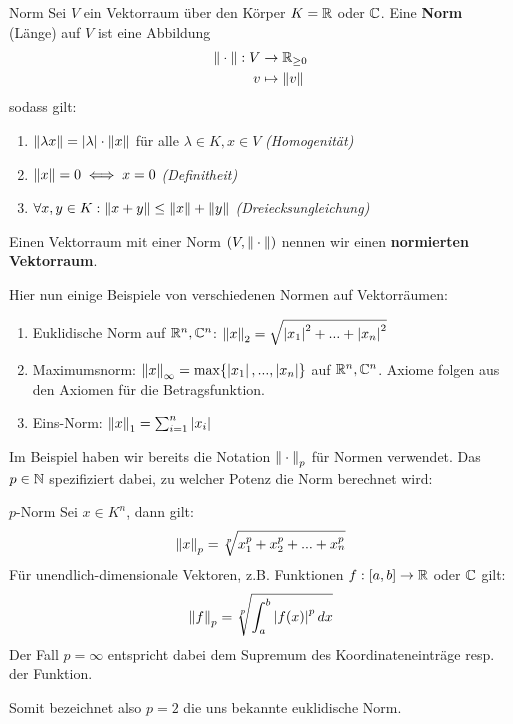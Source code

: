 \begin{definition}{Norm}{}
Sei $V$ ein Vektorraum über den Körper $K = \mathbb{R}$ oder $\mathbb{C}$. Eine \textbf{Norm} (Länge) auf $V$ ist eine Abbildung
\begin{align*}
    \left\|\:\cdot\:\right\|: V &\to \mathbb{R}_{\geq 0}\\
    v &\mapsto \left\|v\right\|
\end{align*}
sodass gilt:
\begin{enumerate}[label=N\arabic*)]
    \item $\left\|\lambda x\right\| = \left|\lambda\right| \cdot \left\|x\right\|$ für alle $\lambda \in K, x \in V$ \hfill \textit{(Homogenität)}
    \item $\left\|x\right\| = 0 \iff x = 0$ \hfill \textit{(Definitheit)}
    \item $\forall x,y \in K: \left\|x+y\right\| \leq \left\|x\right\| + \left\|y\right\|$ \hfill \textit{(Dreiecksungleichung)}
\end{enumerate}
Einen Vektorraum mit einer Norm $(V, \left\|\:\cdot\:\right\|)$ nennen wir einen \textbf{normierten Vektorraum}.
\end{definition}

\begin{example} \label{ex_norm_vr}Hier nun einige Beispiele von verschiedenen Normen auf Vektorräumen:
\begin{enumerate}[label=(\alph*)]
    \item Euklidische Norm auf $\mathbb{R}^n, \mathbb{C}^n$: $\left\|x\right\|_2 = \sqrt{\left|x_1\right|^2+...+\left|x_n\right|^2}$
    \item Maximumsnorm: $\left\|x\right\|_\infty = \max\{\left|x_1\right|,...,\left|x_n\right|\}$
    auf $\mathbb{R}^n, \mathbb{C}^n$. Axiome folgen aus den Axiomen für die Betragsfunktion.
    \item Eins-Norm: $\left\|x\right\|_1 = \sum_{i=1}^n \left|x_i\right|$ 
\end{enumerate}
\end{example}

Im Beispiel haben wir bereits die Notation $\left\|\:\cdot\:\right\|_p$ für Normen verwendet. Das $p \in \mathbb{N}$ spezifiziert dabei, zu welcher Potenz die Norm berechnet wird:
\begin{definition}{$p$-Norm}{}
 Sei $x \in K^n$, dann gilt:
$$\left\|x\right\|_p = \sqrt[p]{x_1^p+x_2^p+...+x_n^p}$$
Für unendlich-dimensionale Vektoren, z.B. Funktionen $f: [a,b] \to \mathbb{R}$ oder $\mathbb{C}$ gilt:
$$\left\|f\right\|_p = \sqrt[p]{\int_a^b\left|f(x)\right|^p dx}$$
Der Fall $p=\infty$ entspricht dabei dem Supremum des Koordinateneinträge resp. der Funktion.
\end{definition}
Somit bezeichnet also $p=2$ die uns bekannte euklidische Norm.

